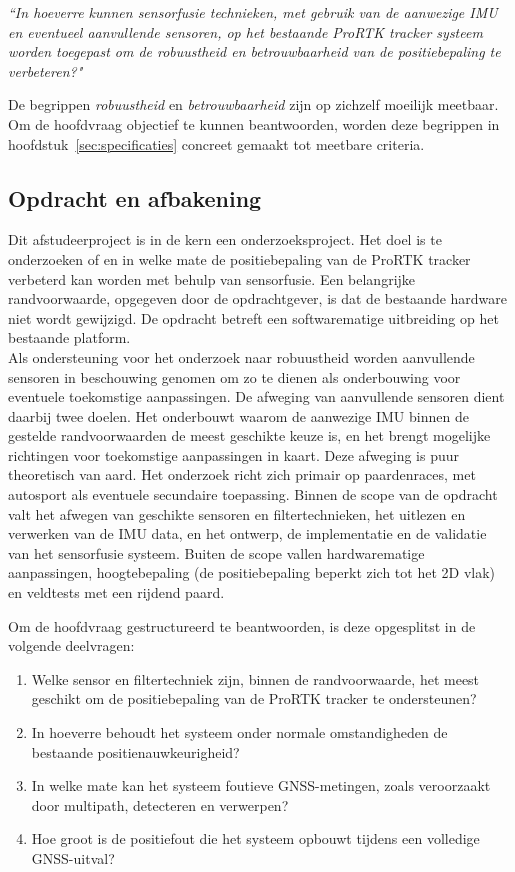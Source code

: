 \begin{tcolorbox}[colback=gray!10, colframe=gray!50, title=Hoofdvraag]
\textit{``In hoeverre kunnen sensorfusie technieken, met gebruik van de aanwezige IMU en eventueel aanvullende sensoren, op het bestaande ProRTK tracker systeem worden toegepast om de robuustheid en betrouwbaarheid van de positiebepaling te verbeteren?"}
\end{tcolorbox}

De begrippen \textit{robuustheid} en \textit{betrouwbaarheid} zijn op zichzelf moeilijk meetbaar. Om de hoofdvraag objectief te kunnen beantwoorden, worden deze begrippen in hoofdstuk~\ref{sec:specificaties} concreet gemaakt tot meetbare criteria.


\subsection{Opdracht en afbakening}

Dit afstudeerproject is in de kern een onderzoeksproject. Het doel is te onderzoeken of en in welke mate de positiebepaling van de ProRTK tracker verbeterd kan worden met behulp van sensorfusie. Een belangrijke randvoorwaarde, opgegeven door de opdrachtgever, is dat de bestaande hardware niet wordt gewijzigd. De opdracht betreft een softwarematige uitbreiding op het bestaande platform. \\

Als ondersteuning voor het onderzoek naar robuustheid worden aanvullende sensoren in beschouwing genomen om zo te dienen als onderbouwing voor eventuele toekomstige aanpassingen. De afweging van aanvullende sensoren dient daarbij twee doelen. Het onderbouwt waarom de aanwezige IMU binnen de gestelde randvoorwaarden de meest geschikte keuze is, en het brengt mogelijke richtingen voor toekomstige aanpassingen in kaart. Deze afweging is puur theoretisch van aard. Het onderzoek richt zich primair op paardenraces, met autosport als eventuele secundaire toepassing. Binnen de scope van de opdracht valt het afwegen van geschikte sensoren en filtertechnieken, het uitlezen en verwerken van de IMU data, en het ontwerp, de implementatie en de validatie van het sensorfusie systeem. Buiten de scope vallen hardwarematige aanpassingen, hoogtebepaling (de positiebepaling beperkt zich tot het 2D vlak) en veldtests met een rijdend paard.

Om de hoofdvraag gestructureerd te beantwoorden, is deze opgesplitst in de volgende 
deelvragen:

\begin{enumerate}
    \item Welke sensor en filtertechniek zijn, binnen de randvoorwaarde, het meest geschikt om de positiebepaling van de ProRTK tracker te 
    ondersteunen?
    \item In hoeverre behoudt het systeem onder normale omstandigheden de bestaande positienauwkeurigheid?
    \item In welke mate kan het systeem foutieve GNSS-metingen, zoals veroorzaakt door multipath, detecteren en verwerpen?
    \item Hoe groot is de positiefout die het systeem opbouwt tijdens een volledige 
    GNSS-uitval?
\end{enumerate}

